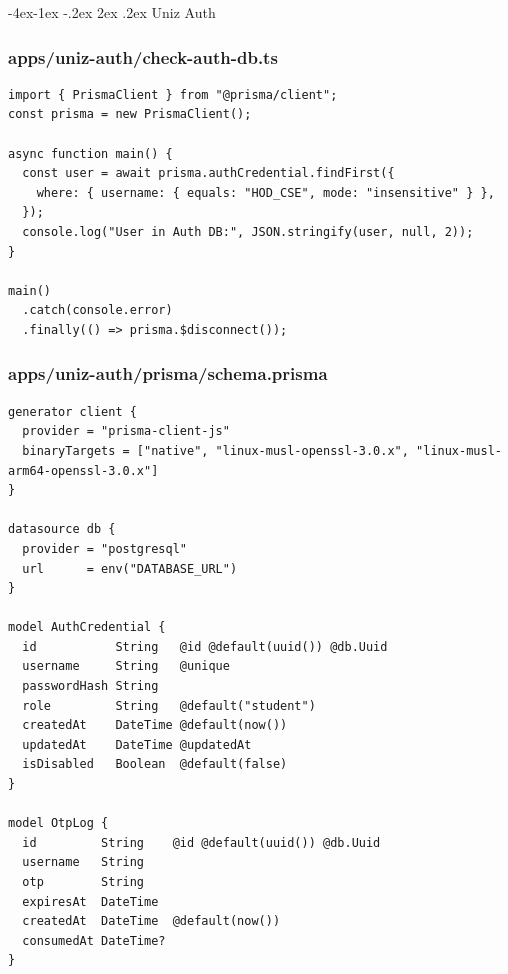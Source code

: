 \documentclass[11pt,a4paper,oneside]{article}
\makeatletter
\renewcommand{\subsection}{\@startsection{subsection}{2}{\z@}%
    {-4ex\@plus -1ex \@minus -.2ex}%
    {2ex \@plus .2ex}%
    {\normalfont\Large\bfseries\color{accent}}}
\makeatother
\begin{document}
\subsection{Uniz Auth}
\subsubsection*{apps/uniz-auth/check-auth-db.ts}
\begin{lstlisting}
import { PrismaClient } from "@prisma/client";
const prisma = new PrismaClient();

async function main() {
  const user = await prisma.authCredential.findFirst({
    where: { username: { equals: "HOD_CSE", mode: "insensitive" } },
  });
  console.log("User in Auth DB:", JSON.stringify(user, null, 2));
}

main()
  .catch(console.error)
  .finally(() => prisma.$disconnect());

\end{lstlisting}
\subsubsection*{apps/uniz-auth/prisma/schema.prisma}
\begin{lstlisting}
generator client {
  provider = "prisma-client-js"
  binaryTargets = ["native", "linux-musl-openssl-3.0.x", "linux-musl-arm64-openssl-3.0.x"]
}

datasource db {
  provider = "postgresql"
  url      = env("DATABASE_URL")
}

model AuthCredential {
  id           String   @id @default(uuid()) @db.Uuid
  username     String   @unique
  passwordHash String
  role         String   @default("student")
  createdAt    DateTime @default(now())
  updatedAt    DateTime @updatedAt
  isDisabled   Boolean  @default(false)
}

model OtpLog {
  id         String    @id @default(uuid()) @db.Uuid
  username   String
  otp        String
  expiresAt  DateTime
  createdAt  DateTime  @default(now())
  consumedAt DateTime?
}
\end{lstlisting}
\end{document}
